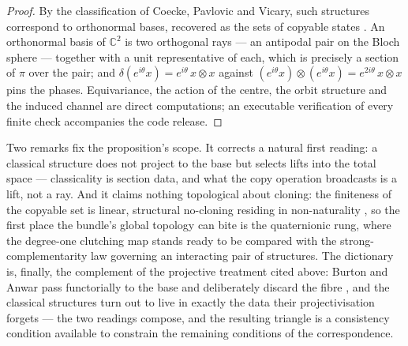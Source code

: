 \begin{proof}
By the classification of Coecke, Pavlovic and Vicary, such structures correspond to orthonormal
bases, recovered as the sets of copyable states \autocite{coeckepavlovicvicary2013orthogonal}. An
orthonormal basis of $\mathbb{C}^{2}$ is two orthogonal rays --- an antipodal pair on the Bloch
sphere --- together with a unit representative of each, which is precisely a section of $\pi$ over
the pair; and $\delta(e^{i\theta}x) = e^{i\theta}\, x \otimes x$ against
$(e^{i\theta}x) \otimes (e^{i\theta}x) = e^{2i\theta}\, x \otimes x$ pins the phases.
Equivariance, the action of the centre, the orbit structure and the induced channel are direct
computations; an executable verification of every finite check accompanies the code release.
\end{proof}

Two remarks fix the proposition's scope. It corrects a natural first reading: a classical structure
does not project to the base but selects lifts into the total space --- classicality is section
data, and what the copy operation broadcasts is a lift, not a ray. And it claims nothing topological
about cloning: the finiteness of the copyable set is linear, structural no-cloning residing in
non-naturality \autocite{abramskyheunen2012hstar}, so the first place the bundle's global topology
can bite is the quaternionic rung, where the degree-one clutching map stands ready to be compared
with the strong-complementarity law governing an interacting pair of structures. The dictionary is,
finally, the complement of the projective treatment cited above: Burton and Anwar pass functorially
to the base and deliberately discard the fibre \autocite{burtonanwar2026meromorphic}, and the
classical structures turn out to live in exactly the data their projectivisation forgets --- the two
readings compose, and the resulting triangle is a consistency condition available to constrain the
remaining conditions of the correspondence.


